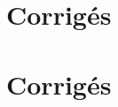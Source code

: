 \documentclass[twoside, a4paper, 12pt, openright, fullpage]{book}
\begin{document}

\section{Corrigés}




\section{Corrigés}



\appendix



\printindex

\newpage



\end{document}
